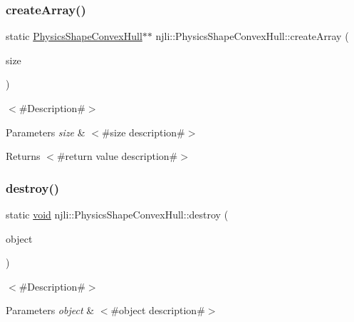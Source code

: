 \subsubsection{\texorpdfstring{create\+Array()}{createArray()}}
{\footnotesize\ttfamily static \mbox{\hyperlink{classnjli_1_1_physics_shape_convex_hull}{Physics\+Shape\+Convex\+Hull}}$\ast$$\ast$ njli\+::\+Physics\+Shape\+Convex\+Hull\+::create\+Array (\begin{DoxyParamCaption}\item[{const \mbox{\hyperlink{_util_8h_a10e94b422ef0c20dcdec20d31a1f5049}{u32}}}]{size }\end{DoxyParamCaption})\hspace{0.3cm}{\ttfamily [static]}}

$<$\#\+Description\#$>$


\begin{DoxyParams}{Parameters}
{\em size} & $<$\#size description\#$>$\\
\hline
\end{DoxyParams}
\begin{DoxyReturn}{Returns}
$<$\#return value description\#$>$ 
\end{DoxyReturn}
\mbox{\label{classnjli_1_1_physics_shape_convex_hull_af78f40a84f2e0a1e4fe2fcf1c5f4ae74}} 
\subsubsection{\texorpdfstring{destroy()}{destroy()}}
{\footnotesize\ttfamily static \mbox{\hyperlink{_thread_8h_af1e856da2e658414cb2456cb6f7ebc66}{void}} njli\+::\+Physics\+Shape\+Convex\+Hull\+::destroy (\begin{DoxyParamCaption}\item[{\mbox{\hyperlink{classnjli_1_1_physics_shape_convex_hull}{Physics\+Shape\+Convex\+Hull}} $\ast$}]{object }\end{DoxyParamCaption})\hspace{0.3cm}{\ttfamily [static]}}

$<$\#\+Description\#$>$


\begin{DoxyParams}{Parameters}
{\em object} & $<$\#object description\#$>$ \\
\hline
\end{DoxyParams}
\mbox{\label{classnjli_1_1_physics_shape_convex_hull_aba4f42fb932f88910c99d97252a446e0}} 
